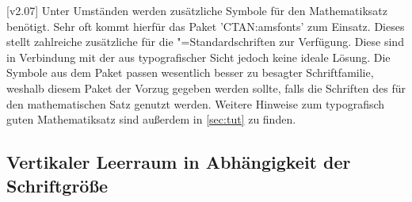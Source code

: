 \begin{DeclareEntity*}{}
\begin{DeclareEntity*}{}
\begin{DeclareEntity*}{}
\begin{Declaration}{}
\begin{Declaration}{}
\begin{Declaration}{}
\begin{Declaration}{}
\begin{Declaration}{}
\begin{Declaration}{}
\begin{Declaration}{}
\begin{Declaration}{}
\begin{Declaration}{}
\begin{Declaration}{}
\begin{Declaration}{}
\begin{Declaration}{}
\begin{Declaration}{}
\begin{Declaration}{}
\begin{Declaration}{}
\begin{Declaration}{}
\begin{Declaration}{}
\end{Declaration}
\end{Declaration}
\end{Declaration}
\end{Declaration}
\end{Declaration}
\end{Declaration}
\end{Declaration}
\end{Declaration}
\end{Declaration}
\end{Declaration}
\end{Declaration}
\end{Declaration}
\end{Declaration}
\end{Declaration}
\end{Declaration}
\end{Declaration}
\end{Declaration}



[v2.07]%
Unter Umständen werden zusätzliche Symbole für den Mathematiksatz benötigt. 
Sehr oft kommt hierfür das Paket 'CTAN:amsfonts' zum Einsatz. 
Dieses stellt zahlreiche zusätzliche für die "=Standardschriften 
zur Verfügung. Diese sind in Verbindung mit der \OpenSans aus typografischer 
Sicht jedoch keine ideale Lösung. Die Symbole aus dem Paket  
passen wesentlich besser zu besagter Schriftfamilie, weshalb diesem Paket der 
Vorzug gegeben werden sollte, falls die Schriften des \CDs für den 
mathematischen Satz genutzt werden. Weitere Hinweise zum typografisch guten 
Mathematiksatz sind außerdem in \autoref{sec:tut} zu finden.
%



\subsection{%
  Vertikaler Leerraum in Abhängigkeit der Schriftgröße%
}


\end{DeclareEntity*}
\end{DeclareEntity*}
\end{DeclareEntity*}
